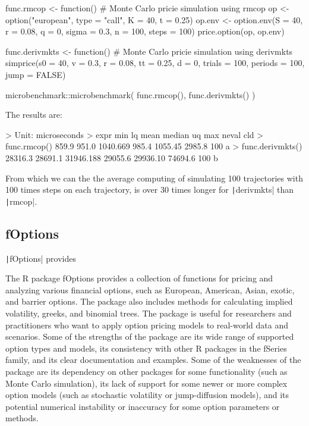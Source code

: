 \begin{Rminted}
func.rmcop <- function() { # Monte Carlo pricie simulation using rmcop
    op <- option("european", type = "call", K = 40, t = 0.25)
    op.env <- option.env(S = 40, r = 0.08, q = 0, sigma = 0.3, n = 100, steps = 100)
    price.option(op, op.env)
}

func.derivmkts <- function() { # Monte Carlo pricie simulation using derivmkts
    simprice(s0 = 40, v = 0.3, r = 0.08, tt = 0.25, d = 0,  trials = 100, periods = 100, jump = FALSE)
}

microbenchmark::microbenchmark(
    func.rmcop(),
    func.derivmkts()
)
\end{Rminted}

The results are:

\begin{Rminted}
> Unit: microseconds
>             expr     min      lq      mean  median       uq     max neval cld
>     func.rmcop()   859.9   951.0  1040.669   985.4  1055.45  2985.8   100  a 
> func.derivmkts() 28316.3 28691.1 31946.188 29055.6 29936.10 74694.6   100  b
\end{Rminted}

From which we can the the average computing of simulating 100 trajectories with 100 times steps on each trajectory, is over 30 times longer for \texttt|derivmkts| than \texttt|rmcop|.



\subsection{fOptions} \label{sub:fOptions}

\texttt|fOptions| provides 

The R package fOptions provides a collection of functions for pricing and analyzing various financial options, such as European, American, Asian, exotic, and barrier options. The package also includes methods for calculating implied volatility, greeks, and binomial trees. The package is useful for researchers and practitioners who want to apply option pricing models to real-world data and scenarios. Some of the strengths of the package are its wide range of supported option types and models, its consistency with other R packages in the fSeries family, and its clear documentation and examples. Some of the weaknesses of the package are its dependency on other packages for some functionality (such as Monte Carlo simulation), its lack of support for some newer or more complex option models (such as stochastic volatility or jump-diffusion models), and its potential numerical instability or inaccuracy for some option parameters or methods.


